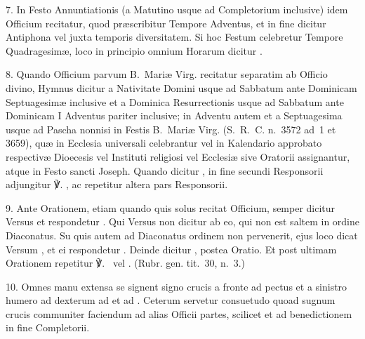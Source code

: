 \begin{multicols}{2}
7. In Festo Annuntiationis (a Matutino usque ad Completorium inclusive)
idem Officium recitatur, quod præscribitur Tempore Adventus, et in fine
dicitur Antiphona  vel 
juxta temporis diversitatem. Si hoc Festum celebretur Tempore Quadragesimæ,
loco  in principio omnium Horarum dicitur
.

8. Quando Officium parvum B.~Mariæ Virg. recitatur separatim ab Officio divino,
Hymnus  dicitur 
a Nativitate Domini usque ad Sabbatum ante Dominicam Septuagesimæ inclusive
et a Dominica Resurrectionis usque ad Sabbatum ante Dominicam I Adventus
pariter inclusive;
in Adventu autem et a Septuagesima usque ad Pascha nonnisi in Festis B.~Mariæ
Virg. (S.~R.~C. n.~3572 ad~1 et 3659), quæ in Ecclesia universali
celebrantur vel in Kalendario approbato respectivæ Dioecesis vel Instituti
religiosi vel Ecclesiæ sive Oratorii assignantur,
atque in Festo sancti Joseph.
Quando dicitur , in fine secundi Responsorii adjungitur
℣. , ac repetitur
altera pars Responsorii.

9. Ante Orationem, etiam quando quis solus recitat Officium,
semper dicitur Versus  et respondetur
. Qui Versus non dicitur ab eo, qui non est saltem
in ordine Diaconatus. Su quis autem ad Diaconatus ordinem non pervenerit,
ejus loco dicat Versum ,
et ei respondetur .
Deinde dicitur , postea Oratio.
Et post ultimam Orationem repetitur ℣.~
vel . (Rubr. gen. tit.~30, n.~3.)

10. Omnes manu extensa se signent signo crucis a fronte ad pectus et a sinistro
humero ad dexterum
ad  et ad . Ceterum servetur
consuetudo quoad sugnum crucis communiter faciendum ad alias Officii partes,
scilicet  et ad benedictionem in fine Completorii.

\end{multicols}
